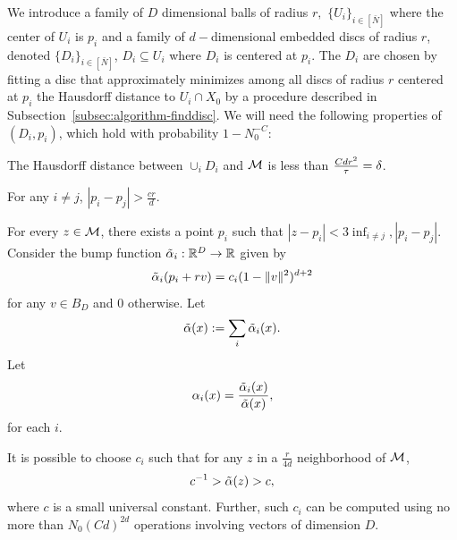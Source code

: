 \documentclass[final, 12pt]{colt2018} %
\begin{document}
We introduce a family of $D$ dimensional balls of radius $r ,$  $\{U_i\}_{i \in [\bar N]}$ where the center of $U_i$ is $p_i$ and a family of $d-$dimensional embedded discs of radius $r$, denoted $\{D_i\}_{i \in [\bar N]}$, $D_i \subseteq U_i$ where $D_i$ is centered at $p_i$. 
The $D_i$ are chosen by fitting a disc that approximately minimizes among all discs of radius $r$ centered at $p_i$  the Hausdorff distance to $U_i \cap X_0$ by a procedure described in Subsection~\ref{subsec:algorithm-finddisc}. 
We will need the following properties of  $(D_i, p_i)$, which hold with probability $1 - N_0^{-C}$:
\ben
\item The Hausdorff distance between $\cup_i D_i$ and $ \mathcal M$ is less than $\frac{Cd r^2}{ \tau} = {\mathbf{\delta}}$.
\item For any $i \neq j$, $|p_i - p_j| > \frac{cr}{{d}}$.
\item For every $z \in  \mathcal M$, there exists a point $p_i$ such that $|z - p_i| <  3 \inf_{i \neq j}, |p_i - p_j|.$ 
\een 
Consider the bump function $\tilde{\alpha}_i:\mathbb R^D \rightarrow \mathbb R$  given by $$\tilde{\alpha}_i(p_i + rv) = c_i (1 - \|v\|^2)^{d+2}$$ for any $v \in B_D$ and $0$ otherwise. 
 Let $$\tilde{\alpha}(x)  := \sum_i \tilde{\alpha}_i(x).$$
Let $$\alpha_i(x) = \frac{\tilde{\alpha}_i(x)}{ \tilde{\alpha}(x)},$$ for each $i$.
\begin{lemma}
It is possible to choose $c_i$  such that for any $z$ in a $\frac{r}{{4d}}$ neighborhood of $\mathcal M$, $$c^{-1} >   \tilde{\alpha}(z) > {c},$$ where $c$ is a small universal constant.  Further, such $c_i$ can be computed using no more than $N_0(Cd)^{2d}$ operations involving vectors of dimension $D$.
\end{lemma}
\end{document}
